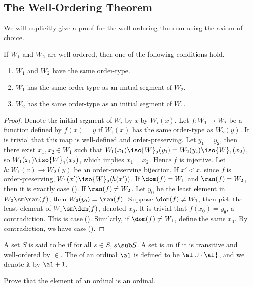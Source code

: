 \documentclass[10pt]{article}
\begin{document}
\subsection{The Well-Ordering Theorem}
We will explicitly give a proof for the well-ordering theorem using the axiom of choice.
\begin{proposition}
    If ${W}_{1}$ and ${W}_{2}$ are well-ordered, then one of the following conditions hold.
    \begin{enumerate}
        \item ${W}_{1}$ and ${W}_{2}$ have the same order-type.
        \item ${W}_{1}$ has the same order-type as an initial segment of ${W}_{2}$.
        \item ${W}_{2}$ has the same order-type as an initial segment of ${W}_{1}$.
    \end{enumerate}
\end{proposition}
\begin{proof}
    Denote the initial segment of ${W}_{i}$ by $x$ by ${W}_{i}(x)$. Let $f:{W}_{1}\to{W}_{2}$ be a function defined by $f(x)=y$ if ${W}_{1}(x)$ has the same order-type as ${W}_{2}(y)$. It is trivial that this map is well-defined and order-preserving. Let ${y}_{1}={y}_{2}$, then there exist ${x}_{1},{x}_{2}\in{W}_{1}$ such that ${W}_{1}({x}_{1})\iso{W}_{2}({y}_{1})={W}_{2}({y}_{2})\iso{W}_{1}({x}_{2})$, so ${W}_{1}({x}_{1})\iso{W}_{1}({x}_{2})$, which implies ${x}_{1}={x}_{2}$. Hence $f$ is injective. Let $h:{W}_{1}(x)\to{W}_{2}(y)$ be an order-preserving bijection. If $x'<x$, since $f$ is order-preserving, ${W}_{1}(x')\iso{W}_{2}(h(x'))$. If $\dom(f)={W}_{1}$ and $\ran(f)={W}_{2}$, then it is exactly case (). If $\ran(f)\ne{W}_{2}$. Let ${y}_{0}$ be the least element in ${W}_{2}\sm\ran(f)$, then ${W}_{2}({y}_{0})=\ran(f)$. Suppose $\dom(f)\ne{W}_{1}$, then pick the least element of ${W}_{1}\sm\dom(f)$, denoted ${x}_{0}$. It is trivial that $f({x}_{0})={y}_{0}$, a contradiction. This is case (). Similarly, if $\dom(f)\ne{W}_{1}$, define the same ${x}_{0}$. By contradiction, we have case ().
\end{proof}
\begin{adefinition}
    A set $S$ is said to be  if for all $s\in S$, $s\sub S$. A set is an  if it is transitive and well-ordered by $\in$. The  of an ordinal $\al$ is defined to be $\al\cup\{\al\}$, and we denote it by $\al+1$. 
\end{adefinition}
\begin{problem}
    Prove that the element of an ordinal is an ordinal.
\end{problem}
\end{document}
